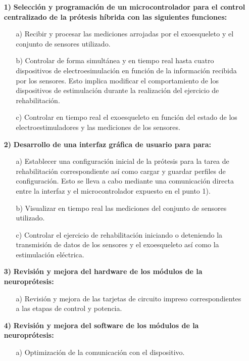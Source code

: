 \begin{itemize}
\item[\textbf{1)}] \textbf{Selección y programación de un microcontrolador para el control centralizado de la prótesis híbrida con las siguientes funciones:}
\begin{itemize}
\item[a)] Recibir y procesar las mediciones arrojadas por el exoesqueleto y el conjunto de sensores utilizado.

\item[b)] Controlar de forma simultánea y en tiempo real hasta cuatro dispositivos de electroesimulación en función de la información recibida por los sensores. Esto implica modificar el comportamiento de los dispositivos de estimulación durante la realización del ejercicio de rehabilitación.

\item[c)] Controlar en tiempo real el exoesqueleto en función del estado de los electroestimuladores y las mediciones de los sensores.


\end{itemize}
\item[\textbf{2)}] \textbf{Desarrollo de una interfaz gráfica de usuario para para:}
\begin{itemize}
\item[a)] Establecer una configuración inicial de la prótesis para la tarea de rehabilitación correspondiente así como cargar y guardar perfiles de configuración. Esto se lleva a cabo mediante una comunicación directa entre la interfaz y el microcontrolador expuesto en el punto 1).

\item[b)] Visualizar en tiempo real las mediciones del conjunto de sensores utilizado.

\item[c)] Controlar el ejercicio de rehabilitación iniciando o deteniendo la transmisión de datos de los sensores y el exoesqueleto así como la estimulación eléctrica.
\end{itemize}


\item[\textbf{3)}] \textbf{Revisión y mejora del hardware de los módulos de la neuroprótesis:}
\begin{itemize}
\item[a)] Revisión y mejora de las tarjetas de circuito impreso correspondientes a las etapas de control y potencia.
\end{itemize}

\item[\textbf{4)}] \textbf{Revisión y mejora del software de los módulos de la neuroprótesis:}
\begin{itemize}
\item[a)] Optimización de la comunicación con el dispositivo.
\end{itemize}
\end{itemize}

